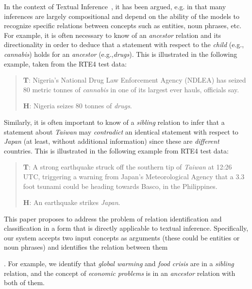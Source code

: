 In the context of Textual
Inference~\cite{DaganGlMa06,HaghighiNMa05,BGPRS05}, it has been
argued, e.g. in \cite{maccartney-manning:2008:PAPERS} that many
inferences are largely compositional and depend on the ability of the
models to recognize specific relations between concepts such as
entities, noun phrases, etc. For example, it is often necessary to
know of an {\em ancestor} relation and its directionality in order to
deduce that a statement with respect to the {\em child} (e.g., {\em
  cannabis}) holds for an {\em ancestor} (e.g.,{\em drugs}). This is
illustrated in the following example, taken from the RTE4 test data:

{\small
  \begin{quote}

    {\bf T}: Nigeria's National Drug Law Enforcement Agency (NDLEA)
    has seized 80 metric tonnes of {\em cannabis} in one of its
    largest ever hauls, officials say.

    {\bf H}: Nigeria seizes 80 tonnes of {\em drugs}.
  \end{quote}
}

Similarly, it is often important to know of a {\em sibling} relation
to infer that a statement about {\em Taiwan} may {\em contradict} an
identical statement with respect to {\em Japan} (at least, without
additional information) since these are {\em different}
countries. This is illustrated in the following example from RTE4 test
data:

{\small
\begin{quote}

  {\bf T}: A strong earthquake struck off the southern tip of {\em
    Taiwan} at 12:26 UTC, triggering a warning from Japan's
  Meteorological Agency that a 3.3 foot tsunami could be heading
  towards Basco, in the Philippines.

  {\bf H}: An earthquake strikes {\em Japan}.
\end{quote}
}

This paper proposes to address the problem of relation identification
and classification in a form that is directly applicable to textual
inference.
%
Specifically, our system accepts two input concepts as arguments
(these could be entities or noun phrases) and identifies the relation
between them . For example, we
identify that {\em global warming} and {\em food crisis} are in a {\em
  sibling} relation, and the concept of {\em economic problems} is in
an {\em ancestor} relation with both of them.

